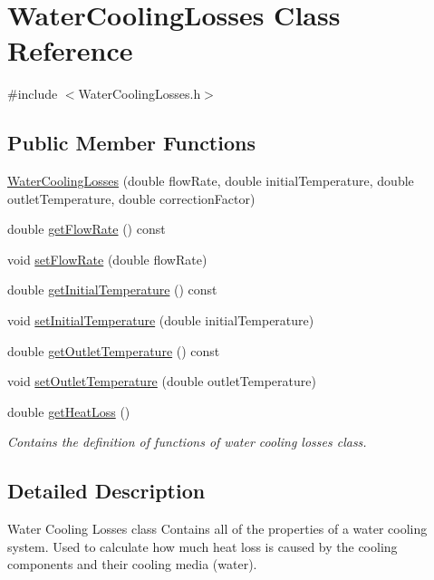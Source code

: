 \hypertarget{class_water_cooling_losses}{}\section{Water\+Cooling\+Losses Class Reference}
\label{class_water_cooling_losses}


{\ttfamily \#include $<$Water\+Cooling\+Losses.\+h$>$}

\subsection*{Public Member Functions}
\begin{DoxyCompactItemize}
\item 
\hyperlink{class_water_cooling_losses_ac95601d8c56e7243ffa3e022819a112f}{Water\+Cooling\+Losses} (double flow\+Rate, double initial\+Temperature, double outlet\+Temperature, double correction\+Factor)
\item 
double \hyperlink{class_water_cooling_losses_a47f1b7d46f0e34ae898150a7c69e5f18}{get\+Flow\+Rate} () const
\item 
void \hyperlink{class_water_cooling_losses_abf4d64d9261818af331613791374d42f}{set\+Flow\+Rate} (double flow\+Rate)
\item 
double \hyperlink{class_water_cooling_losses_a205b469029ec9cd4d792169bf8589f24}{get\+Initial\+Temperature} () const
\item 
void \hyperlink{class_water_cooling_losses_a56b0b64b71ecbece780622d5f4b536ba}{set\+Initial\+Temperature} (double initial\+Temperature)
\item 
double \hyperlink{class_water_cooling_losses_a79fb78755e813b2a3aa36ccd8ccebf7a}{get\+Outlet\+Temperature} () const
\item 
void \hyperlink{class_water_cooling_losses_a36bb100df0580a78f63f266cdc1d41f5}{set\+Outlet\+Temperature} (double outlet\+Temperature)
\item 
double \hyperlink{class_water_cooling_losses_a8f884cc70d7af7add5bb1be7f837384c}{get\+Heat\+Loss} ()
\begin{DoxyCompactList}\small\item\em Contains the definition of functions of water cooling losses class. \end{DoxyCompactList}\end{DoxyCompactItemize}


\subsection{Detailed Description}
Water Cooling Losses class Contains all of the properties of a water cooling system. Used to calculate how much heat loss is caused by the cooling components and their cooling media (water). 

